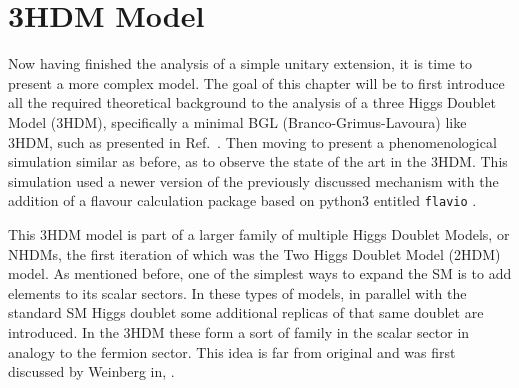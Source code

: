 %

\newpage 

\chapter{3HDM Model}
\label{ch:3HDM}

%


Now having finished the analysis of a simple unitary extension, it is time to present a more complex model. 
%
The goal of this chapter will be to first introduce all the required theoretical background to the analysis of a three Higgs Doublet Model (3HDM), specifically a minimal BGL (Branco-Grimus-Lavoura) like 3HDM, such as presented in Ref.~\cite{Ludvig_Thesis}. 
% 
Then moving to present a phenomenological simulation similar as before, as to observe the state of the art in the 3HDM. 
%
This simulation used a newer version of the previously discussed mechanism with the addition of a flavour calculation package based on python3 entitled \texttt{flavio} \cite{straub2018flavio}. 

This 3HDM model is part of a larger family of multiple Higgs Doublet Models, or NHDMs, the first iteration of which was the Two Higgs Doublet Model (2HDM) model. 
% 
As mentioned before, one of the simplest ways to expand the SM is to add elements to its scalar sectors.
%
In these types of models, in parallel with the standard SM Higgs doublet some additional replicas of that same doublet are introduced. 
%
In the 3HDM these form a sort of family in the scalar sector in analogy to the fermion sector. 
%
This idea is far from original and was first discussed by Weinberg in, \cite{Weinberg1976}.

